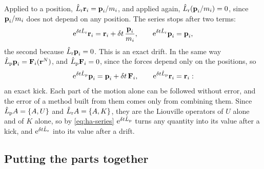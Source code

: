 Applied to a position, $\hat{L}_{\mathrm r}\bm{\mathrm{r}}_i = \bm{\mathrm{p}}_i/m_i$, and
applied again, $\hat{L}_{\mathrm r}(\bm{\mathrm{p}}_i/m_i) = 0$, since $\bm{\mathrm{p}}_i/m_i$
does not depend on any position. The series stops after two terms:
\begin{equation*}
   \mathrm{e}^{\delta t\hat{L}_{\mathrm r}}\bm{\mathrm{r}}_i = \bm{\mathrm{r}}_i + \delta t\,\frac{\bm{\mathrm{p}}_i}
   {m_i} , \qquad \mathrm{e}^{\delta t\hat{L}_{\mathrm r}}\bm{\mathrm{p}}_i = \bm{\mathrm{p}}_i ,
\end{equation*}
the second because $\hat{L}_{\mathrm r}\bm{\mathrm{p}}_i = 0$. This is an exact
drift. In the same way $\hat{L}_{\mathrm p}\bm{\mathrm{p}}_i = \bm{\mathrm{F}}_i(\bm{\mathrm{r}}^N)$,
and $\hat{L}_{\mathrm p}\bm{\mathrm{F}}_i = 0$, since the forces depend only on the
positions, so
\begin{equation*}
   \mathrm{e}^{\delta t\hat{L}_{\mathrm p}}\bm{\mathrm{p}}_i = \bm{\mathrm{p}}_i + \delta t\,\bm{\mathrm{F}}_i ,
   \qquad \mathrm{e}^{\delta t\hat{L}_{\mathrm p}}\bm{\mathrm{r}}_i = \bm{\mathrm{r}}_i :
\end{equation*}
an exact kick. Each part of the motion alone can be followed without
error, and the error of a method built from them comes only from
combining them. Since $\hat{L}_{\mathrm p}A = \{A, U\}$ and $\hat{L}_{\mathrm
r}A = \{A, K\}$, they are the Liouville operators of $U$ alone and of $K$
alone, so by \cref{eq:ha-series} $\mathrm{e}^{\delta t\hat{L}_{\mathrm p}}$ turns
any quantity into its value after a kick, and $\mathrm{e}^{\delta t\hat{L}_{\mathrm
r}}$ into its value after a drift.

\subsection*{Putting the parts together}

